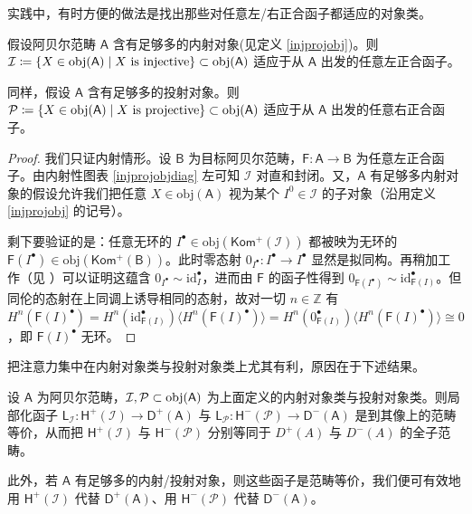 实践中，有时方便的做法是找出那些对任意左/右正合函子都适应的对象类。

\begin{Lem}\label{enoughinjprojobj}
	假设阿贝尔范畴 $\mathsf{A}$ 含有足够多的内射对象\textup(见定义 \ref{injprojobj}\textup)。则 $\mathcal{I}\coloneqq\{X\in\textup{obj}(\mathsf{A})\mid X\text{ is injective}\}\subset\textup{obj}(\mathsf{A})$ 适应于从 $\mathsf{A}$ 出发的任意左正合函子。
	
	同样，假设 $\mathsf{A}$ 含有足够多的投射对象。则 $\mathcal{P}\coloneqq\{X\in\textup{obj}(\mathsf{A})\mid X\text{ is projective}\}\subset\textup{obj}(\mathsf{A})$ 适应于从 $\mathsf{A}$ 出发的任意右正合函子。
\end{Lem}

\begin{proof}
	我们只证内射情形。设 $\mathsf{B}$ 为目标阿贝尔范畴，$\mathsf{F}:\mathsf{A}\rightarrow\mathsf{B}$ 为任意左正合函子。由内射性图表 \eqref{injprojobjdiag} 左可知 $\mathcal{I}$ 对直和封闭。又，$\mathsf{A}$ 有足够多内射对象的假设允许我们把任意 $X\in\text{obj}(\mathsf{A})$ 视为某个 $I^0\in\mathcal{I}$ 的子对象（沿用定义 \ref{injprojobj} 的记号）。
	
	剩下要验证的是：任意无环的 $I^\bullet\in\text{obj}(\mathsf{Kom^+(\mathcal{I})})$ 都被映为无环的 $\mathsf{F}(I^\bullet)\in\text{obj}(\mathsf{Kom^+(B)})$。此时零态射 $0_{I^\bullet}: I^\bullet\rightarrow I^\bullet$ 显然是拟同构。再稍加工作（见 \cite[subsection III.5.24]{[GM03]}）可以证明这蕴含 $0_{I^\bullet}\sim\text{id}_I^\bullet$，进而由 $\mathsf{F}$ 的函子性得到 $0_{\mathsf{F}(I^\bullet)}\sim\text{id}_{\mathsf{F}(I)}^\bullet$。但同伦的态射在上同调上诱导相同的态射，故对一切 $n\in\mathbb{Z}$ 有 $H^n(\mathsf{F}(I)^\bullet)=H^n(\text{id}_{\mathsf{F}(I)}^\bullet)\langle H^n(\mathsf{F}(I)^\bullet)\rangle = H^n(0_{\mathsf{F}(I)}^\bullet)\langle H^n(\mathsf{F}(I)^\bullet)\rangle \cong 0$，即 $\mathsf{F}(I)^\bullet$ 无环。
\end{proof}

把注意力集中在内射对象类与投射对象类上尤其有利，原因在于下述结果。

\begin{Pro}\label{injprojderivedarehomotopy}
	设 $\mathsf{A}$ 为阿贝尔范畴，$\mathcal{I}, \mathcal{P}\subset\textup{obj}(\mathsf{A})$ 为上面定义的内射对象类与投射对象类。则局部化函子 $\mathsf{L}_\mathcal{I}:\mathsf{H^+(\mathcal{I})}\rightarrow\mathsf{D^+(A)}$ 与 $\mathsf{L}_\mathcal{P}:\mathsf{H^-(\mathcal{P})}\rightarrow\mathsf{D^-(A)}$ 是到其像上的范畴等价，从而把 $\mathsf{H^+(\mathcal{I})}$ 与 $\mathsf{H^-(\mathcal{P})}$ 分别等同于 ${D^+(A)}$ 与 ${D^-(A)}$ 的全子范畴。
	
	此外，若 $\mathsf{A}$ 有足够多的内射/投射对象，则这些函子是范畴等价，我们便可有效地用 $\mathsf{H^+(\mathcal{I})}$ 代替 $\mathsf{D^+(A)}$、用 $\mathsf{H^-(\mathcal{P})}$ 代替 $\mathsf{D^-(A)}$。
\end{Pro} 

